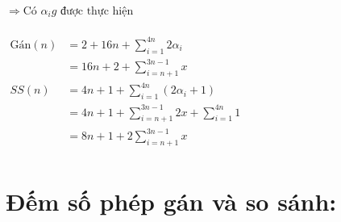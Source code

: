 \documentclass[12pt, letterpaper]{article}
\begin{document}
{{{	$\Rightarrow \text{Có } \alpha_i g \text{ được thực hiện }$  \\
	 \\
	$ \begin{aligned}
		\text{Gán}(n) & = 2 + 16n + \sum^{4n}_{i = 1} 2 \alpha_i \\
			& = 16n + 2 + \sum^{3n-1}_{i = n + 1} x\\
		SS(n) & = 4n + 1 + \sum^{4n}_{i = 1} (2 \alpha_i + 1) \\
			& = 4n + 1 + \sum^{3n-1}_{i = n + 1} 2x + \sum^{4n}_{i = 1} 1 \\
			& = 8n + 1 + 2\sum^{3n-1}_{i = n + 1} x \\
	\end{aligned} $ \\
\section{Đếm số phép gán và so sánh:}

}}}
\end{document}
